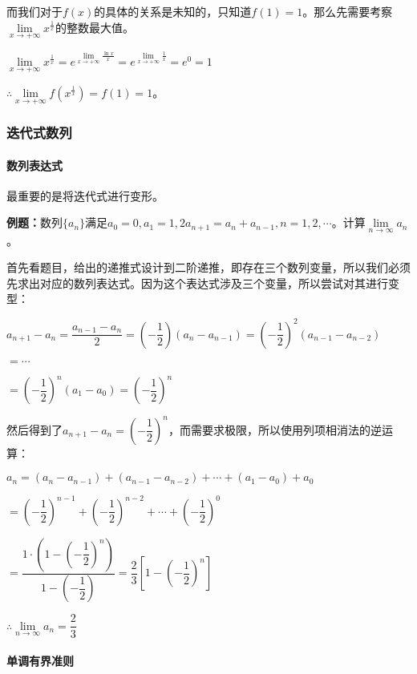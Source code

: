 \documentclass[UTF8, 12pt]{ctexart}
\begin{document}
而我们对于$f(x)$的具体的关系是未知的，只知道$f(1)=1$。那么先需要考察$\lim\limits_{x\to+\infty}x^{\frac{1}{x}}$的整数最大值。

$\lim\limits_{x\to+\infty}x^{\frac{1}{x}}=e^{\lim\limits_{x\to+\infty}\frac{\ln x}{x}}=e^{\lim\limits_{x\to+\infty}\frac{1}{x}}=e^0=1$

$\therefore\lim\limits_{x\to+\infty}f(x^{\frac{1}{x}})=f(1)=1$。

\subsubsection{迭代式数列}

\paragraph{数列表达式} \leavevmode \medskip

最重要的是将迭代式进行变形。

\textbf{例题：}数列$\{a_n\}$满足$a_0=0,a_1=1,2a_{n+1}=a_n+a_{n-1},n=1,2,\cdots$。计算$\lim\limits_{n\to\infty}a_n$。

首先看题目，给出的递推式设计到二阶递推，即存在三个数列变量，所以我们必须先求出对应的数列表达式。因为这个表达式涉及三个变量，所以尝试对其进行变型：

$a_{n+1}-a_n=\dfrac{a_{n-1}-a_n}{2}=\left(-\dfrac{1}{2}\right)(a_n-a_{n-1})=\left(-\dfrac{1}{2}\right)^2(a_{n-1}-a_{n-2})$

$=\cdots$

$=\left(-\dfrac{1}{2}\right)^n(a_1-a_0)=\left(-\dfrac{1}{2}\right)^n$

然后得到了$a_{n+1}-a_n=\left(-\dfrac{1}{2}\right)^n$，而需要求极限，所以使用列项相消法的逆运算：

$a_n=(a_n-a_{n-1})+(a_{n-1}-a_{n-2})+\cdots+(a_1-a_0)+a_0$\medskip

$=\left(-\dfrac{1}{2}\right)^{n-1} + \left(-\dfrac{1}{2}\right)^{n-2} + \cdots + \left(-\dfrac{1}{2}\right)^0$\medskip

$=\dfrac{1\cdot\left(1-\left(-\dfrac{1}{2}\right)^n\right)}{1-\left(-\dfrac{1}{2}\right)}=\dfrac{2}{3}\left[1-\left(-\dfrac{1}{2}\right)^n\right]$\medskip

$\therefore\lim\limits_{n\to\infty}a_n=\dfrac{2}{3}$

\paragraph{单调有界准则} \leavevmode \medskip
\end{document}
